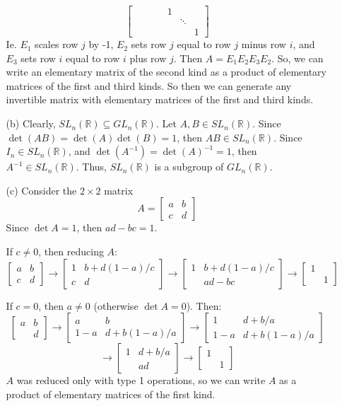 \documentclass[12pt]{article}
\begin{document}
\begin{itemize}
\begin{itemize}
$$\begin{bmatrix}
& & & & 1 \\
& & & & & \ddots \\
& & & & & & 1
\end{bmatrix}$$
Ie. $E_1$ scales row $j$ by -1, $E_2$ sets row $j$ equal to row $j$ minus row $i$, and $E_3$ sets row $i$ equal to row $i$ plus row $j$. Then $A = E_1E_2E_3E_2$. So, we can write an elementary matrix of the second kind as a product of elementary matrices of the first and third kinds. So then we can generate any invertible matrix with elementary matrices of the first and third kinds.
\item[(b)]
Clearly, $SL_n(\mathbb{R}) \subseteq GL_n(\mathbb{R})$. Let $A, B \in SL_n(\mathbb{R})$. Since $\det(AB) = \det(A)\det(B) = 1$, then $AB \in SL_n(\mathbb{R})$. Since $I_n \in SL_n(\mathbb{R})$, and $\det(A^{-1}) = \det(A)^{-1} = 1$, then $A^{-1} \in SL_n(\mathbb{R})$. Thus, $SL_n(\mathbb{R})$ is a subgroup of $GL_n(\mathbb{R})$. 
\item[(c)]
Consider the $2 \times 2$ matrix
$$A = \begin{bmatrix}
a & b \\
c & d
\end{bmatrix}$$
Since $\det A = 1$, then $ad - bc = 1$.

If $c \neq 0$, then reducing $A$:
$$\begin{bmatrix}
a & b \\
c & d
\end{bmatrix} \rightarrow \begin{bmatrix}
1 & b + d(1-a)/c \\
c & d
\end{bmatrix} \rightarrow \begin{bmatrix}
1 & b + d(1-a)/c \\
& ad - bc
\end{bmatrix} \rightarrow \begin{bmatrix}
1 & \\
& 1
\end{bmatrix} $$

If $c = 0$, then $a \neq 0$ (otherwise $\det A = 0$). Then:
$$\begin{bmatrix}
a & b \\
& d
\end{bmatrix} \rightarrow \begin{bmatrix}
a & b \\
1 - a & d + b(1 - a)/a
\end{bmatrix} \rightarrow \begin{bmatrix}
1 & d + b/a \\
1 - a & d + b(1 - a)/a
\end{bmatrix}$$
$$\rightarrow \begin{bmatrix}
1 & d + b/a \\
& ad
\end{bmatrix} \rightarrow \begin{bmatrix}
1 & \\
& 1
\end{bmatrix}$$
$A$ was reduced only with type 1 operations, so we can write $A$ as a product of elementary matrices of the first kind. 


\end{itemize}
\end{itemize}
\end{document}
